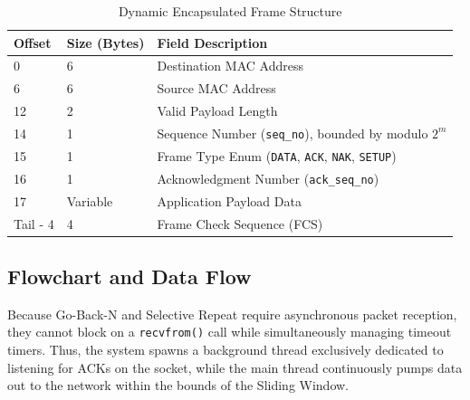 \documentclass[12pt, a4paper]{article}
\begin{document}
\vspace{10pt}
\begin{table}[H]
\centering
\begin{tabular}{|l|l|l|}
\hline
\textbf{Offset} & \textbf{Size (Bytes)} & \textbf{Field Description} \\ \hline
0 & 6 & Destination MAC Address \\ \hline
6 & 6 & Source MAC Address \\ \hline
12 & 2 & Valid Payload Length \\ \hline
14 & 1 & Sequence Number (\texttt{seq\_no}), bounded by modulo $2^m$ \\ \hline
15 & 1 & Frame Type Enum (\texttt{DATA}, \texttt{ACK}, \texttt{NAK}, \texttt{SETUP}) \\ \hline
16 & 1 & Acknowledgment Number (\texttt{ack\_seq\_no}) \\ \hline
17 & Variable & Application Payload Data \\ \hline
Tail - 4 & 4 & Frame Check Sequence (FCS) \\ \hline
\end{tabular}
\caption{Dynamic Encapsulated Frame Structure}
\end{table}

\subsection{Flowchart and Data Flow}
Because Go-Back-N and Selective Repeat require asynchronous packet reception, they cannot block on a \texttt{recvfrom()} call while simultaneously managing timeout timers. Thus, the system spawns a background thread exclusively dedicated to listening for ACKs on the socket, while the main thread continuously pumps data out to the network within the bounds of the Sliding Window.
\end{document}
